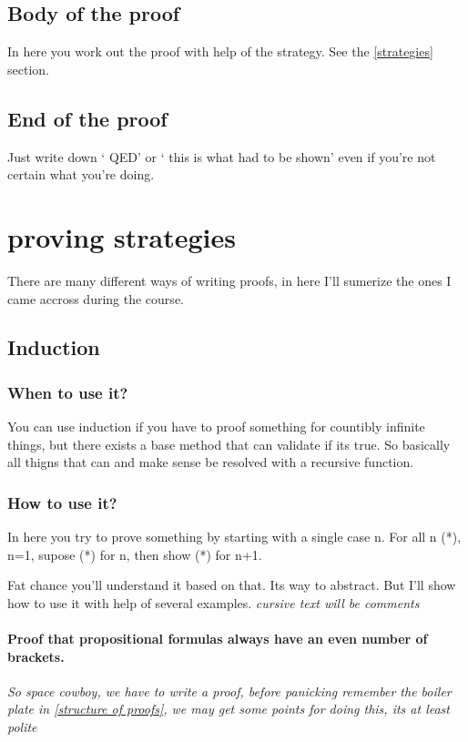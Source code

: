 \documentclass{article}
\begin{document}
\subsection{Body of the proof}
In here you work out the proof with help of the strategy.
See the \autoref{strategies} section.

\subsection{End of the proof}
Just write down ` QED' or ` this is what had to be shown' even if you're not
certain what you're doing.

\section{proving strategies}
\label{strategies}
There are many different ways of writing proofs, in here I'll sumerize the ones
I came accross during the course.

\subsection{Induction}
\label{induction}
\subsubsection{When to use it?}
You can use induction if you have to proof something for countibly infinite
things, but there exists a base method that can validate if its true.
So basically all thigns that can and make sense be resolved with a
recursive function.

\subsubsection{How to use it?}
In here you try to prove something by starting with a single case n.
For all n (*), n=1, supose (*) for n, then show (*) for n+1.

Fat chance you'll understand it based on that. Its way to abstract.
But I'll show how to use it with help of several examples. \emph{cursive
text will be comments}

\paragraph{Proof that propositional formulas always have an even number of brackets.}
\emph{So space cowboy, we have to write a proof, before panicking remember
	the boiler plate in \autoref{structure of proofs}, we may get some
points for doing this, its at least polite}
\end{document}
